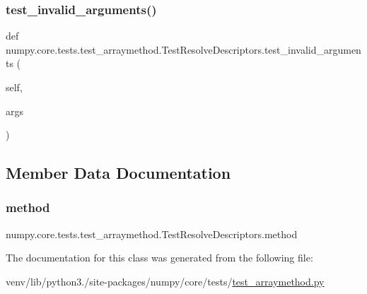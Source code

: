 \subsubsection{\texorpdfstring{test\+\_\+invalid\+\_\+arguments()}{test\_invalid\_arguments()}}
{\footnotesize\ttfamily def numpy.\+core.\+tests.\+test\+\_\+arraymethod.\+Test\+Resolve\+Descriptors.\+test\+\_\+invalid\+\_\+arguments (\begin{DoxyParamCaption}\item[{}]{self,  }\item[{}]{args }\end{DoxyParamCaption})}



\subsection{Member Data Documentation}
\mbox{\label{classnumpy_1_1core_1_1tests_1_1test__arraymethod_1_1TestResolveDescriptors_a3831c68922479562356b07880cc7362a}} 
\subsubsection{\texorpdfstring{method}{method}}
{\footnotesize\ttfamily numpy.\+core.\+tests.\+test\+\_\+arraymethod.\+Test\+Resolve\+Descriptors.\+method\hspace{0.3cm}{\ttfamily [static]}}



The documentation for this class was generated from the following file\+:\begin{DoxyCompactItemize}
\item 
venv/lib/python3./site-\/packages/numpy/core/tests/\hyperlink{test__arraymethod_8py}{test\+\_\+arraymethod.\+py}\end{DoxyCompactItemize}

